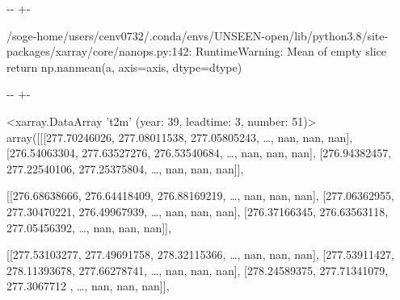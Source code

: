 \documentclass[letterpaper,10pt,english]{sphinxmanual}
\newlength\nbsphinxcodecellspacing
\begin{document}
{

\kern-\sphinxverbatimsmallskipamount\kern-\baselineskip
\kern+\FrameHeightAdjust\kern-\fboxrule
\vspace{\nbsphinxcodecellspacing}

\begin{sphinxVerbatim}[commandchars=\\\{\}]
/soge-home/users/cenv0732/.conda/envs/UNSEEN-open/lib/python3.8/site-packages/xarray/core/nanops.py:142: RuntimeWarning: Mean of empty slice
  return np.nanmean(a, axis=axis, dtype=dtype)
\end{sphinxVerbatim}
}

{

\kern-\sphinxverbatimsmallskipamount\kern-\baselineskip
\kern+\FrameHeightAdjust\kern-\fboxrule
\vspace{\nbsphinxcodecellspacing}

\begin{sphinxVerbatim}[commandchars=\\\{\}]
\llap{\color{nbsphinxout}[37]:\,\hspace{\fboxrule}\hspace{\fboxsep}}<xarray.DataArray 't2m' (year: 39, leadtime: 3, number: 51)>
array([[[277.70246026, 277.08011538, 277.05805243, {\ldots},          nan,
                  nan,          nan],
        [276.54063304, 277.63527276, 276.53540684, {\ldots},          nan,
                  nan,          nan],
        [276.94382457, 277.22540106, 277.25375804, {\ldots},          nan,
                  nan,          nan]],

       [[276.68638666, 276.64418409, 276.88169219, {\ldots},          nan,
                  nan,          nan],
        [277.06362955, 277.30470221, 276.49967939, {\ldots},          nan,
                  nan,          nan],
        [276.37166345, 276.63563118, 277.05456392, {\ldots},          nan,
                  nan,          nan]],

       [[277.53103277, 277.49691758, 278.32115366, {\ldots},          nan,
                  nan,          nan],
        [277.53911427, 278.11393678, 277.66278741, {\ldots},          nan,
                  nan,          nan],
        [278.24589375, 277.71341079, 277.3067712 , {\ldots},          nan,
                  nan,          nan]],


\end{sphinxVerbatim}}
\end{document}
